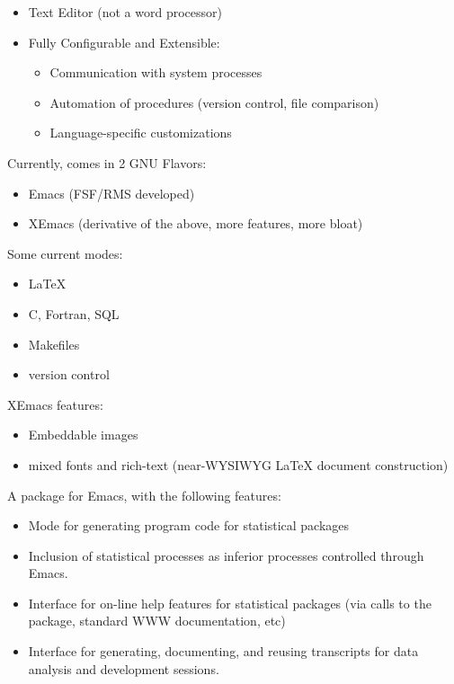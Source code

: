 \documentclass[semhelv]{seminar}
\begin{document}
\begin{slide}

  \begin{itemize}
  \item Text Editor (not a word processor)
  \item Fully Configurable and Extensible:
    \begin{itemize}
    \item Communication with system processes
    \item Automation of procedures (version control, file comparison)
    \item Language-specific customizations
  \end{itemize}
\end{itemize}

  Currently, comes in 2 GNU Flavors:
  \begin{itemize}
  \item Emacs (FSF/RMS developed)
  \item XEmacs (derivative of the above, more features, more bloat)
  \end{itemize}
  
\end{slide}

Some current modes:
\begin{itemize}
\item \LaTeX
\item C, Fortran, SQL
\item Makefiles
\item version control
\end{itemize}

XEmacs features:
\begin{itemize}
\item Embeddable images
\item mixed fonts and rich-text (near-WYSIWYG LaTeX document
  construction)
\end{itemize}

\begin{slide}
  
  A package for Emacs, with the following features:
  \begin{itemize}
  \item Mode for generating program code for statistical packages
  \item Inclusion of statistical processes as inferior processes
    controlled through Emacs.
  \item Interface for on-line help features for statistical packages
    (via calls to the package, standard WWW documentation, etc)
  \item Interface for generating, documenting, and reusing transcripts
    for data analysis and development sessions.
  \end{itemize}

\end{slide}
\end{document}
